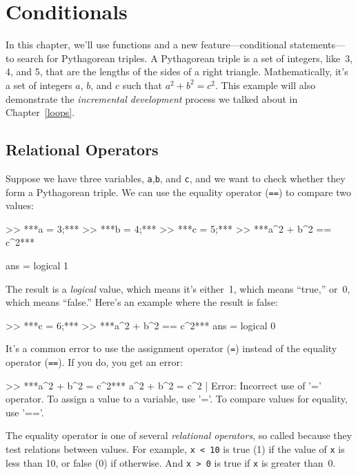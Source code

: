 \chapter{Conditionals}

In this chapter, we'll use functions and a new feature---conditional statements---to search for Pythagorean triples.
A Pythagorean triple is a set of integers, like~3, 4, and 5,
that are the lengths of the sides of a right triangle.  Mathematically, it's a set of integers $a$, $b$, and $c$ such that $a^2 + b^2 = c^2$.
This example will also demonstrate the \emph{incremental development} process we talked about in Chapter~\ref{loops}.


\section{Relational Operators}

Suppose we have three variables, \lstinline{a},\lstinline{b}, and \lstinline{c}, and we want to check whether they form a Pythagorean triple.  We can use the equality operator (\lstinline{==}) to compare two values:

\begin{code}
>> ***a = 3;***
>> ***b = 4;***
>> ***c = 5;***
>> ***a^2 + b^2 == c^2***

ans = logical 1
\end{code}

The result is a \emph{logical} value, which means it's either~1, which means ``true,'' or~0, which means ``false.''  Here's an example where the result is false:

\begin{code}
>> ***c = 6;***
>> ***a^2 + b^2 == c^2***
ans = logical 0
\end{code}

It's a common error to use the assignment operator (\lstinline{=}) instead of the equality operator (\lstinline{==}).  If you do, you get an error:

\begin{code}
>> ***a^2 + b^2 = c^2***
 a^2 + b^2 = c^2
           |
Error: Incorrect use of '=' operator. 
To assign a value to a variable, use '='. 
To compare values for equality, use '=='.
\end{code}

The equality operator is one of several \emph{relational operators}, so called because they test relations between values.
For example, \lstinline{x < 10} is true (1) if the value of \lstinline{x} is less than 10, or false (0) if otherwise.  And \lstinline{x > 0} is true if \lstinline{x} is greater than~0.

